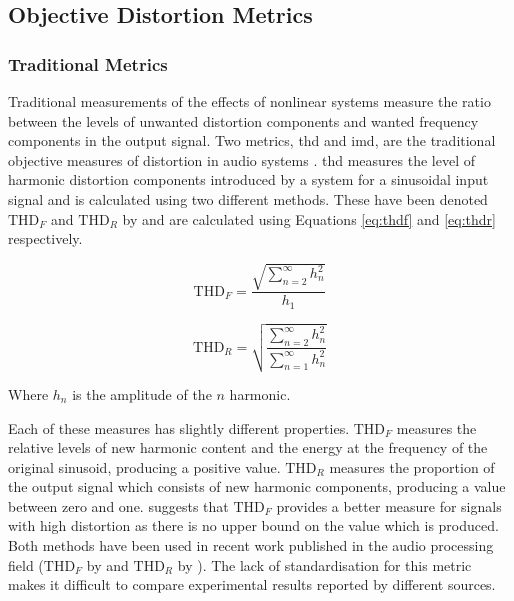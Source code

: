 	\subsection{Objective Distortion Metrics}
	\label{sec:Excitation-Analysis-Metrics}
		\subsubsection*{Traditional Metrics}
			Traditional measurements of the effects of nonlinear systems measure the ratio between the levels
			of unwanted distortion components and wanted frequency components in the output signal. Two
			metrics, \acrfull{thd} and \acrfull{imd}, are the traditional objective measures of distortion in
			audio systems \citep{czerwinski2001multitone1}. \acrshort{thd} measures the level of harmonic
			distortion components introduced by a system for a sinusoidal input signal and is calculated using
			two different methods. These have been denoted $\mathrm{THD}_{F}$ and $\mathrm{THD}_{R}$ by
			\citet{shmilovitz2005on} and are calculated using Equations \ref{eq:thdf} and \ref{eq:thdr}
			respectively.

			\begin{equation}
				\mathrm{THD}_{F} = \frac{\sqrt{\sum_{n = 2}^{\infty} h_{n}^{2}}}{h_{1}}
				\label{eq:thdf}
			\end{equation}

			\begin{equation}
				\mathrm{THD}_{R} = \sqrt{\frac{\sum_{n = 2}^{\infty} h_{n}^{2}}
								       {\sum_{n = 1}^{\infty} h_{n}^{2}}}
				\label{eq:thdr}
			\end{equation}

			Where $h_{n}$ is the amplitude of the $n$ harmonic. 

			Each of these measures has slightly different properties. $\mathrm{THD}_{F}$ measures the relative
			levels of new harmonic content and the energy at the frequency of the original sinusoid, producing
			a positive value. $\mathrm{THD}_{R}$ measures the proportion of the output signal which consists of
			new harmonic components, producing a value between zero and one. \citet{shmilovitz2005on} suggests
			that $\mathrm{THD}_{F}$ provides a better measure for signals with high distortion as there is no
			upper bound on the value which is produced.  Both methods have been used in recent work published
			in the audio processing field ($\mathrm{THD}_{F}$ by \citet{fleischmann2014a} and
			$\mathrm{THD}_{R}$ by \citet{dutilleux2011nonlinear}).  The lack of standardisation for this metric
			makes it difficult to compare experimental results reported by different sources.

